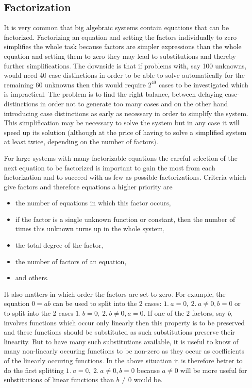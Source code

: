 \documentclass[12pt]{article}
\begin{document}
\subsection{Factorization}
    It is very common that big algebraic systems contain equations that
    can be factorized. Factorizing an equation and setting the factors
    individually to zero simplifies the whole task because factors are
    simpler expressions than the whole equation and setting them to zero 
    they may lead to substitutions and thereby further simplifications. The
    downside is that if problems with, say 100 unknowns, would need 40
    case-distinctions in order to be able to solve automatically for the
    remaining 60 unknowns then this would require $2^{40}$ cases to be
    investigated which is impractical. The problem is to find the right
    balance, between delaying case-distinctions in order not to generate
    too many cases and on the other hand introducing case distinctions
    as early as necessary in order to simplify the system. This
    simplification may be necessary to solve the system but in any
    case it will speed up its solution (although at the price of having
    to solve a simplified system at least twice, depending on the number
    of factors).
    
    For large systems with many factorizable equations the careful
    selection of the next equation to be factorized is important to
    gain the most from each factorization and to succeed with as few
    as possible factorizations.  Criteria which give factors and
    therefore equations a higher priority are
    \begin{itemize}
    \item the number of equations in which this factor occurs,
    \item if the factor is a single unknown function or constant, 
      then the number of times this
      unknown turns up in the whole system,
    \item the total degree of the factor,
    \item the number of factors of an equation,
    \item and others.
    \end{itemize}
    It also matters in which order the factors are set to zero. For
    example, the equation  $0=ab$ can be used to split into the 2
    cases: $1.\ a=0, \ 2.\ a\neq 0, b=0$ or to split into the 2 cases
    $1.\ b=0, \ 2.\ b\neq 0, a=0$. If one of the 2 factors, say $b$, involves
    functions which occur only linearly then this property is to be
    preserved and these functions should be substituted as such
    substitutions preserve their linearity. But to have many such
    substitutions available, it is useful to know of many non-linearly
    occuring functions to be non-zero as they occur as coefficients of
    the linearly occuring functions. In the above situation it is
    therefore better to do the first splitting $1.\ a=0, \ 2.\ a\neq 0, b=0$
    because $a\neq 0$ will be more useful for substitutions of linear
    functions than $b\neq 0$ would be. 
\end{document}
